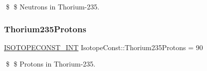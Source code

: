 \$ \$ Neutrons in Thorium-\/235. \mbox{\label{group___isotope_const-_thorium-_th235_ga6480f12da2c4f41f546f9d7603b3b2c7}} 
\subsubsection{\texorpdfstring{Thorium235\+Protons}{Thorium235Protons}}
{\footnotesize\ttfamily \mbox{\hyperlink{group___isotope_const-_macros_ga5f18360b3e99483a35c32d789e62621c}{I\+S\+O\+T\+O\+P\+E\+C\+O\+N\+S\+T\+\_\+\+I\+NT}} Isotope\+Const\+::\+Thorium235\+Protons = 90}

\$ \$ Protons in Thorium-\/235. 